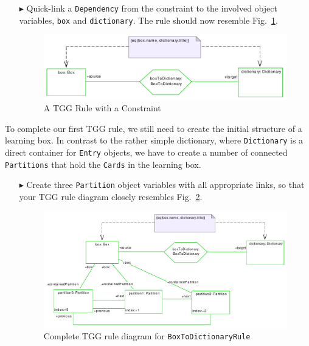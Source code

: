 \begin{enumerate}
\item[$\blacktriangleright$] Quick-link a \texttt{Dependency} from the constraint to the involved object variables, \texttt{box} and \texttt{dictionary}. 
The rule should now resemble Fig.~\ref{fig:tgg_rule_with_constraint}. 

\begin{figure}[htbp]
\begin{center}
  \includegraphics[width=\textwidth]{pics/tggBilder/tggRule/tgg14}
  \caption{A TGG Rule with a Constraint}  
  \label{fig:tgg_rule_with_constraint}
\end{center}
\end{figure}

\end{enumerate} 

To complete our first TGG rule, we still need to create the initial structure of a learning box.
In contrast to the rather simple dictionary, where \texttt{Dictionary} is a direct container for \texttt{Entry} objects, we have to create a number of connected \texttt{Partitions} that hold the \texttt{Cards} in the learning box.

\begin{enumerate}
\item[$\blacktriangleright$] Create three \texttt{Partition} object variables with all appropriate links, so that your TGG rule diagram closely resembles Fig.~\ref{fig:boxtodictionaryrule_complete}.

\begin{figure}[htbp]
\begin{center}
  \includegraphics[width=\textwidth]{pics/tggBilder/tggRule/tgg15}
  \caption{Complete TGG rule diagram for \texttt{BoxToDictionaryRule}}  
  \label{fig:boxtodictionaryrule_complete}
\end{center}
\end{figure}

\end{enumerate}


